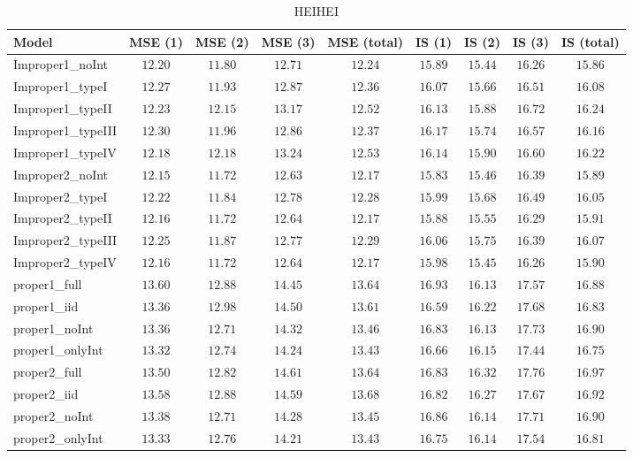 \begin{table}

\caption{\label{tab:model-choice-sc11}HEIHEI}
\centering
\begin{tabular}{lcccccccc}
\hline
Model  & MSE (1) & MSE (2) & MSE (3) & MSE (total) & IS (1) & IS (2) & IS (3) & \multicolumn{1}{c}{IS (total)} \\ 
\hline
Improper1_noInt  & $12.20$ & $11.80$ & $12.71$ & $12.24$ & $15.89$ & $15.44$ & $16.26$ & $15.86$ \\
Improper1_typeI  & $12.27$ & $11.93$ & $12.87$ & $12.36$ & $16.07$ & $15.66$ & $16.51$ & $16.08$ \\
Improper1_typeII  & $12.23$ & $12.15$ & $13.17$ & $12.52$ & $16.13$ & $15.88$ & $16.72$ & $16.24$ \\
Improper1_typeIII  & $12.30$ & $11.96$ & $12.86$ & $12.37$ & $16.17$ & $15.74$ & $16.57$ & $16.16$ \\
Improper1_typeIV  & $12.18$ & $12.18$ & $13.24$ & $12.53$ & $16.14$ & $15.90$ & $16.60$ & $16.22$ \\
Improper2_noInt  & $12.15$ & $11.72$ & $12.63$ & $12.17$ & $15.83$ & $15.46$ & $16.39$ & $15.89$ \\
Improper2_typeI  & $12.22$ & $11.84$ & $12.78$ & $12.28$ & $15.99$ & $15.68$ & $16.49$ & $16.05$ \\
Improper2_typeII  & $12.16$ & $11.72$ & $12.64$ & $12.17$ & $15.88$ & $15.55$ & $16.29$ & $15.91$ \\
Improper2_typeIII  & $12.25$ & $11.87$ & $12.77$ & $12.29$ & $16.06$ & $15.75$ & $16.39$ & $16.07$ \\
Improper2_typeIV  & $12.16$ & $11.72$ & $12.64$ & $12.17$ & $15.98$ & $15.45$ & $16.26$ & $15.90$ \\
proper1_full  & $13.60$ & $12.88$ & $14.45$ & $13.64$ & $16.93$ & $16.13$ & $17.57$ & $16.88$ \\
proper1_iid  & $13.36$ & $12.98$ & $14.50$ & $13.61$ & $16.59$ & $16.22$ & $17.68$ & $16.83$ \\
proper1_noInt  & $13.36$ & $12.71$ & $14.32$ & $13.46$ & $16.83$ & $16.13$ & $17.73$ & $16.90$ \\
proper1_onlyInt  & $13.32$ & $12.74$ & $14.24$ & $13.43$ & $16.66$ & $16.15$ & $17.44$ & $16.75$ \\
proper2_full  & $13.50$ & $12.82$ & $14.61$ & $13.64$ & $16.83$ & $16.32$ & $17.76$ & $16.97$ \\
proper2_iid  & $13.58$ & $12.88$ & $14.59$ & $13.68$ & $16.82$ & $16.27$ & $17.67$ & $16.92$ \\
proper2_noInt  & $13.38$ & $12.71$ & $14.28$ & $13.45$ & $16.86$ & $16.14$ & $17.71$ & $16.90$ \\
proper2_onlyInt  & $13.33$ & $12.76$ & $14.21$ & $13.43$ & $16.75$ & $16.14$ & $17.54$ & $16.81$ \\
\hline 
\end{tabular}


\end{table}